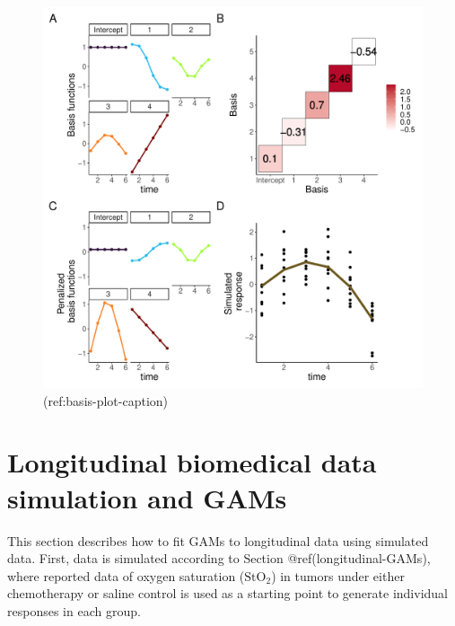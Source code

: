 \documentclass[Royal,times,sagev]{sagej}
\begin{document}
\begin{figure}

{\centering \includegraphics[width=0.75\linewidth]{Full_document_SAGE_files/figure-latex/basis-plot-appendix-1} 

}

\caption{(ref:basis-plot-caption)}\label{fig:basis-plot-appendix}
\end{figure}

\hypertarget{tumor-data-simulation}{%
\section{Longitudinal biomedical data simulation and
GAMs}\label{tumor-data-simulation}}

This section describes how to fit GAMs to longitudinal data using
simulated data. First, data is simulated according to Section
@ref(longitudinal-GAMs), where reported data of oxygen saturation
(\(\mbox{StO}_2\)) in tumors under either chemotherapy or saline control
is used as a starting point to generate individual responses in each
group.
\end{document}
